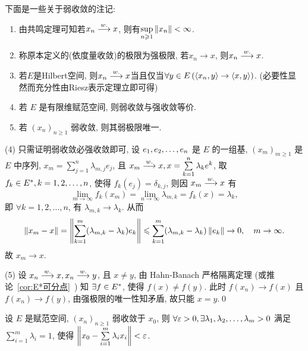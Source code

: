 	\begin{Remark}
		下面是一些关于弱收敛的注记:
		\begin{enumerate}[(1)]
			\item 由共鸣定理可知若$ x_n\weakto x $, 则有$ \sup\limits_{n\geqslant 1}\norm{x_n}<\infty $.
			\item 称原本定义的(依度量收敛)的极限为强极限, 若$ x_n\to x $, 则$ x_n\weakto x $.
			\item 若$ E $是Hilbert空间, 则$ x_n\weakto x $当且仅当$ \forall y\in E\,(\lrangle{x_n,y}\to\lrangle{x,y}) $. (必要性显然而充分性由Riesz表示定理立即可得)
			\item 若 $ E $ 是有限维赋范空间, 则弱收敛与强收敛等价.
			\item 若 $ (x_{n})_{n\geqslant1} $ 弱收敛, 则其弱极限唯一.
		\end{enumerate}

	\end{Remark}

	\begin{Proof}
		(4) 只需证明弱收敛必强收敛即可, 设 $ \seq{e} $ 是 $ E $ 的一组基, $ (x_{m})_{m\geqslant1} $ 是 $ E $ 中序列, $ x_{m}=\sum\limits_{j=1}^{n}\lambda_{m, j}e_{j} $, 且 $ x_{m}\weakto x, x=\sum\limits_{k=1}^{n}\lambda_{k}e^{k} $, 取 $ f_{k}\in\Star{E}, k = 1, 2, \dots, n $, 使得 $ f_{k}(e_{j})=\delta_{k, j} $, 则因 $ x_{m}\weakto x $ 有
		\[
			\lim_{m\to\infty}f_{k}(x_{m})=\lim_{n\to\infty}\lambda_{m, k}=f_{k}(x)=\lambda_{k},
		\]
		即 $ \forall k=1, 2, \dots, n $, 有 $ \lambda_{m, k}\to \lambda_{k} $. 从而
		\[
			\norm{x_{m}-x}=\norm{\sum_{k=1}^{m}(\lambda_{m, k}-\lambda_{k})e_{k}}\leqslant\sum_{k=1}^{m}(\lambda_{m, k}-\lambda_{k})\norm{e_{k}}\to 0, \quad m\to \infty.
		\]
		故 $ x_{m}\to x $.

		(5) 设 $ x_{n}\weakto x, x_{n}\weakto y $, 且 $ x\ne y $, 由 Hahn-Banach 严格隔离定理 (或推论~\ref{cor:E*可分点}~) 知 $ \exists f\in\Star{E} $, 使得 $ f(x)\ne f(y) $. 此时 $ f(x_{n})\to f(x) $ 且 $ f(x_{n})\to f(y) $, 由强极限的唯一性知矛盾, 故只能 $ x=y $.\qed
	\end{Proof}

	\begin{Theorem}[Mazur]
		设 $ E $ 是赋范空间,  $ (x_{n})_{n\geqslant1} $ 弱收敛于 $ x_{0} $, 则 $ \forall \varepsilon>0, \exists\seq[m]{\lambda}>0 $ 满足 $ \sum\limits_{i=1}^{m}\lambda_{i}=1 $, 使得 $ \norm{x_{0}-\sum\limits_{i=1}^{m}\lambda_{i}x_{i}}<\varepsilon $.
	\end{Theorem}


